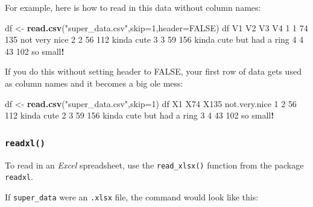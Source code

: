 \documentclass[]{book}
\newenvironment{Shaded}{\begin{snugshade}}{\end{snugshade}}
\newcommand{\DataTypeTok}[1]{\textcolor[rgb]{0.13,0.29,0.53}{#1}}
\newcommand{\DecValTok}[1]{\textcolor[rgb]{0.00,0.00,0.81}{#1}}
\newcommand{\KeywordTok}[1]{\textcolor[rgb]{0.13,0.29,0.53}{\textbf{#1}}}
\newcommand{\NormalTok}[1]{#1}
\newcommand{\OperatorTok}[1]{\textcolor[rgb]{0.81,0.36,0.00}{\textbf{#1}}}
\newcommand{\OtherTok}[1]{\textcolor[rgb]{0.56,0.35,0.01}{#1}}
\newcommand{\StringTok}[1]{\textcolor[rgb]{0.31,0.60,0.02}{#1}}
\begin{document}
For example, here is how to read in this data without column names:

\begin{Shaded}
\begin{Highlighting}[]
\NormalTok{df <-}\StringTok{ }\KeywordTok{read.csv}\NormalTok{(}\StringTok{"super_data.csv"}\NormalTok{,}\DataTypeTok{skip=}\DecValTok{1}\NormalTok{,}\DataTypeTok{header=}\OtherTok{FALSE}\NormalTok{)}
\NormalTok{df}
\NormalTok{  V1 V2  V3                        V4}
\DecValTok{1}  \DecValTok{1} \DecValTok{74} \DecValTok{135}\NormalTok{             not very nice}
\DecValTok{2}  \DecValTok{2} \DecValTok{56} \DecValTok{112}\NormalTok{                kinda cute}
\DecValTok{3}  \DecValTok{3} \DecValTok{59} \DecValTok{156}\NormalTok{ kinda cute but had a ring}
\DecValTok{4}  \DecValTok{4} \DecValTok{43} \DecValTok{102}\NormalTok{                 so small}\OperatorTok{!}
\end{Highlighting}
\end{Shaded}

If you do this without setting header to FALSE, your first row of data gets used as column names and it becomes a big ole mess:

\begin{Shaded}
\begin{Highlighting}[]
\NormalTok{df <-}\StringTok{ }\KeywordTok{read.csv}\NormalTok{(}\StringTok{"super_data.csv"}\NormalTok{,}\DataTypeTok{skip=}\DecValTok{1}\NormalTok{)}
\NormalTok{df}
\NormalTok{  X1 X74 X135             not.very.nice}
\DecValTok{1}  \DecValTok{2}  \DecValTok{56}  \DecValTok{112}\NormalTok{                kinda cute}
\DecValTok{2}  \DecValTok{3}  \DecValTok{59}  \DecValTok{156}\NormalTok{ kinda cute but had a ring}
\DecValTok{3}  \DecValTok{4}  \DecValTok{43}  \DecValTok{102}\NormalTok{                 so small}\OperatorTok{!}
\end{Highlighting}
\end{Shaded}

\hypertarget{readxl}{%
\subsubsection*{\texorpdfstring{\texttt{readxl()}}{readxl()}}\label{readxl}}

To read in an \emph{Excel} spreadsheet, use the \texttt{read\_xlsx()} function from the package \texttt{readxl}.

If \texttt{super\_data} were an \texttt{.xlsx} file, the command would look like this:
\end{document}

